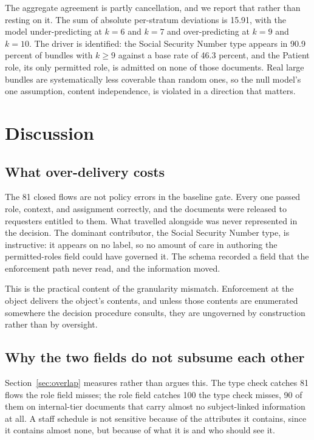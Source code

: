 \documentclass[conference]{IEEEtran}
\begin{document}
The aggregate agreement is partly cancellation, and we report that rather than
resting on it. The sum of absolute per-stratum deviations is 15.91, with the
model under-predicting at $k=6$ and $k=7$ and over-predicting at $k=9$ and
$k=10$. The driver is identified: the Social Security Number type appears in
90.9 percent of bundles with $k \geq 9$ against a base rate of 46.3 percent, and
the Patient role, its only permitted role, is admitted on none of those
documents. Real large bundles are systematically less coverable than random
ones, so the null model's one assumption, content independence, is violated in a
direction that matters.

\section{Discussion}

\subsection{What over-delivery costs}
The 81 closed flows are not policy errors in the baseline gate. Every one passed
role, context, and assignment correctly, and the documents were released to
requesters entitled to them. What travelled alongside was never represented in
the decision. The dominant contributor, the Social Security Number type, is
instructive: it appears on no label, so no amount of care in authoring the
permitted-roles field could have governed it. The schema recorded a field that
the enforcement path never read, and the information moved.

This is the practical content of the granularity mismatch. Enforcement at the
object delivers the object's contents, and unless those contents are enumerated
somewhere the decision procedure consults, they are ungoverned by construction
rather than by oversight.

\subsection{Why the two fields do not subsume each other}
Section~\ref{sec:overlap} measures rather than argues this. The type check
catches 81 flows the role field misses; the role field catches 100 the type
check misses, 90 of them on internal-tier documents that carry almost no
subject-linked information at all. A staff schedule is not sensitive because of
the attributes it contains, since it contains almost none, but because of what
it is and who should see it.
\end{document}
